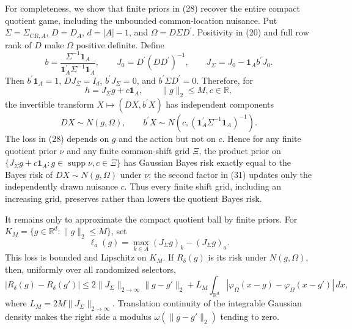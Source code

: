 For completeness, we show that finite priors in (28) recover the entire compact quotient game, including the unbounded common-location nuisance.  Put \(\Sigma=\Sigma_{CR,A}\), \(D=D_A\), \(d=|A|-1\), and \(\Omega=D\Sigma D^{\prime}\).  Positivity in (20) and full row rank of \(D\) make \(\Omega\) positive definite.  Define
\[
b=\frac{\Sigma^{-1}\mathbf1_A}{\mathbf1_A^{\prime}\Sigma^{-1}\mathbf1_A},
\qquad
J_0=D^{\prime}(DD^{\prime})^{-1},
\qquad
J_\Sigma=J_0-\mathbf1_A b^{\prime}J_0.
\tag{29}
\]
Then \(b^{\prime}\mathbf1_A=1\), \(DJ_\Sigma=I_d\), \(b^{\prime}J_\Sigma=0\), and \(b^{\prime}\Sigma D^{\prime}=0\).  Therefore, for
\[
h=J_\Sigma g+c\mathbf1_A,
\qquad \lVert g\rVert_2\leq M, c\in\mathbb R,
\tag{30}
\]
the invertible transform \(X\mapsto(DX,b^{\prime}X)\) has independent components
\[
DX\sim N(g,\Omega),
\qquad
b^{\prime}X\sim N\!\left(c,
(\mathbf1_A^{\prime}\Sigma^{-1}\mathbf1_A)^{-1}\right).
\tag{31}
\]
The loss in (28) depends on \(g\) and the action but not on \(c\).  Hence for any finite quotient prior \(\nu\) and any finite common-shift grid \(\Xi\), the product prior on \(\{J_\Sigma g+c\mathbf1_A:g\in\operatorname{supp}\nu,c\in\Xi\}\) has Gaussian Bayes risk exactly equal to the Bayes risk of \(DX\sim N(g,\Omega)\) under \(\nu\): the second factor in (31) updates only the independently drawn nuisance \(c\).  Thus every finite shift grid, including an increasing grid, preserves rather than lowers the quotient Bayes risk.

It remains only to approximate the compact quotient ball by finite priors.  For \(K_M=\{g\in\mathbb R^d:\lVert g\rVert_2\leq M\}\), set
\[
\ell_a(g)=\max_{k\in A}(J_\Sigma g)_k-(J_\Sigma g)_a.
\tag{32}
\]
This loss is bounded and Lipschitz on \(K_M\).  If \(R_\delta(g)\) is its risk under \(N(g,\Omega)\), then, uniformly over all randomized selectors,
\[
|R_\delta(g)-R_\delta(g')|
\leq
2\lVert J_\Sigma\rVert_{2\to\infty}\lVert g-g'\rVert_2
+L_M\int_{\mathbb R^d}|\varphi_\Omega(x-g)-\varphi_\Omega(x-g')|\,dx,
\tag{33}
\]
where \(L_M=2M\lVert J_\Sigma\rVert_{2\to\infty}\).  Translation continuity of the integrable Gaussian density makes the right side a modulus \(\omega(\lVert g-g'\rVert_2)\) tending to zero.

